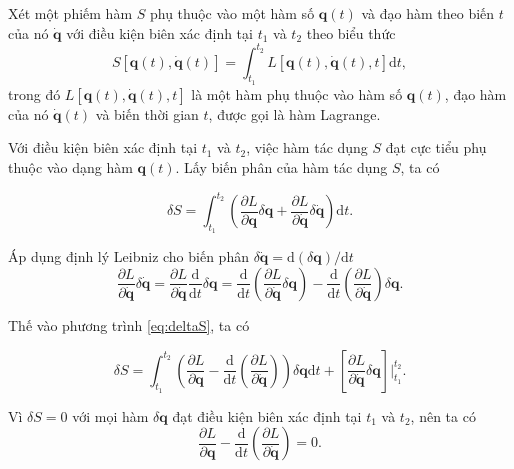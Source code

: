 Xét một phiếm hàm \(S\) phụ thuộc vào một hàm số \(\mathbf{q}(t)\) và đạo hàm theo biến \(t\) của nó \(\mathbf{\dot{q}}\) với điều kiện biên xác định tại \(t_1\) và \(t_2\) theo biểu thức
\begin{equation}
    S \left[\mathbf{q}(t), \mathbf{\dot{q}}(t)\right] = \int_{t_1}^{t_2} L\left[ \mathbf{q}(t), \mathbf{\dot{q}}(t), t \right] \mathrm{d}t,
\end{equation}
trong đó \(L\left[ \mathbf{q}(t), \mathbf{\dot{q}}(t), t \right]\) là một hàm phụ thuộc vào hàm số \(\mathbf{q}(t)\), đạo hàm của nó \(\mathbf{\dot{q}}(t)\) và biến thời gian \(t\), được gọi là hàm Lagrange.

Với điều kiện biên xác định tại \(t_1\) và \(t_2\), việc hàm tác dụng \(S\) đạt cực tiểu phụ thuộc vào dạng hàm \(\mathbf{q}(t)\). Lấy biến phân của hàm tác dụng \(S\), ta có

\begin{equation} \label{eq:deltaS}
    \delta S = \int_{t_1}^{t_2} \left( \frac{\partial L}{\partial \mathbf{q}} \delta \mathbf{q} + \frac{\partial L}{\partial \mathbf{\dot{q}}} \delta \mathbf{\dot{q}} \right) \mathrm{d}t.
\end{equation}

Áp dụng định lý Leibniz cho biến phân \(\delta \mathbf{\dot{q}} = \mathrm{d}\left( \delta \mathbf{q} \right) /\mathrm{d}t\)
\begin{equation}
    \dfrac{\partial L}{\partial \mathbf{\dot{q}}} \delta \mathbf{\dot{q}} = \frac{\partial L}{\partial \mathbf{\dot{q}}} \frac{\mathrm{d}}{\mathrm{d}t} \delta \mathbf{q} = \frac{\mathrm{d}}{\mathrm{d}t} \left( \frac{\partial L}{\partial \mathbf{\dot{q}}} \delta \mathbf{q} \right) - \frac{\mathrm{d}}{\mathrm{d}t} \left( \frac{\partial L}{\partial \mathbf{\dot{q}}} \right) \delta \mathbf{q}.
\end{equation}

Thế vào phương trình \eqref{eq:deltaS}, ta có

\begin{equation}
    \delta S = \int_{t_1}^{t_2} \left( \frac{\partial L}{\partial \mathbf{q}} - \frac{\mathrm{d}}{\mathrm{d}t} \left( \frac{\partial L}{\partial \mathbf{\dot{q}}} \right) \right) \delta \mathbf{q} \mathrm{d}t + \left[ \frac{\partial L}{\partial \mathbf{\dot{q}}} \delta \mathbf{q} \right] \Big|_{t_1}^{t_2}.
\end{equation}

Vì \(\delta S = 0\) với mọi hàm \(\delta \mathbf{q}\) đạt điều kiện biên xác định tại \(t_1\) và \(t_2\), nên ta có
\begin{equation} \label{eq:EL}
    \frac{\partial L}{\partial \mathbf{q}} - \frac{\mathrm{d}}{\mathrm{d}t} \left( \frac{\partial L}{\partial \mathbf{\dot{q}}} \right) = 0.
\end{equation}

